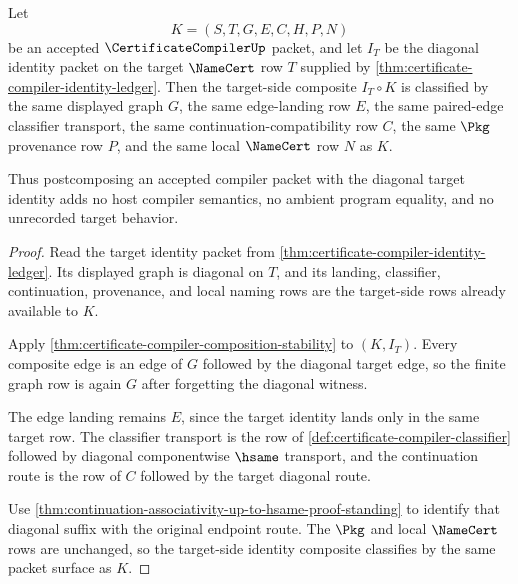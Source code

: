 \begin{theorem}
\label{thm:certificate-compiler-right-identity-unit}
Let
$$
K=(S,T,G,E,C,H,P,N)
$$
be an accepted $\CertificateCompilerUp$ packet, and let $I_T$ be the diagonal
identity packet on the target $\NameCert$ row $T$ supplied by
\autoref{thm:certificate-compiler-identity-ledger}. Then the target-side
composite $I_T\circ K$ is classified by the same displayed graph $G$, the same
edge-landing row $E$, the same paired-edge classifier transport, the same
continuation-compatibility row $C$, the same $\Pkg$ provenance row $P$, and
the same local $\NameCert$ row $N$ as $K$.

Thus postcomposing an accepted compiler packet with the diagonal target
identity adds no host compiler semantics, no ambient program equality, and no
unrecorded target behavior.
\end{theorem}
\begin{proof}
Read the target identity packet from
\autoref{thm:certificate-compiler-identity-ledger}. Its displayed graph is
diagonal on $T$, and its landing, classifier, continuation, provenance, and
local naming rows are the target-side rows already available to $K$.

Apply \autoref{thm:certificate-compiler-composition-stability} to $(K,I_T)$.
Every composite edge is an edge of $G$ followed by the diagonal target edge, so
the finite graph row is again $G$ after forgetting the diagonal witness.

The edge landing remains $E$, since the target identity lands only in the same
target row. The classifier transport is the row of
\autoref{def:certificate-compiler-classifier} followed by diagonal
componentwise $\hsame$ transport, and the continuation route is the row of $C$
followed by the target diagonal route.

Use \autoref{thm:continuation-associativity-up-to-hsame-proof-standing} to
identify that diagonal suffix with the original endpoint route. The $\Pkg$ and
local $\NameCert$ rows are unchanged, so the target-side identity composite
classifies by the same packet surface as $K$.
\end{proof}

